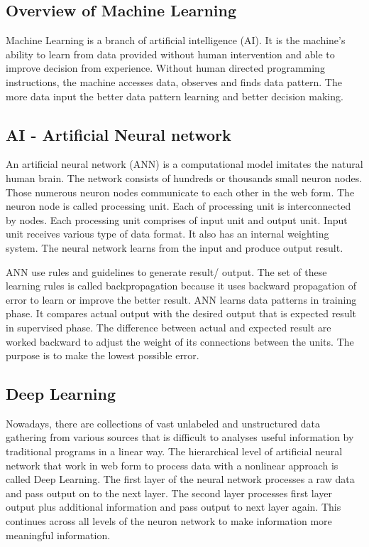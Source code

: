 \documentclass[12pt,oneside,openright,a4paper]{cpe-english-project}
\begin{document}
\subsection{Overview of Machine Learning}

\hspace{10mm}Machine Learning is a branch of artificial intelligence (AI).  It is the machine’s ability to learn from data provided without human intervention and able to improve decision from experience.  Without human directed programming instructions, the machine accesses data, observes and finds data pattern. The more data input the better data pattern learning and better decision making.\cite{ml}

\subsection{AI - Artificial Neural network}

\hspace{10mm}An artificial neural network (ANN) is a computational model imitates the natural human brain. The network consists of hundreds or thousands small neuron nodes. Those numerous neuron nodes communicate to each other in the web form. The neuron node is called processing unit. Each of processing unit is interconnected by nodes. Each processing unit comprises of input unit and output unit. Input unit receives various type of data format. It also has an internal weighting system. The neural network learns from the input and produce output result.

\hspace{10mm}ANN use rules and guidelines to generate result/ output. The set of these learning rules is called backpropagation because it uses backward propagation of error to learn or improve the better result. ANN learns data patterns in training phase. It compares actual output with the desired output that is expected result in supervised phase. The difference between actual and expected result are worked backward to adjust the weight of its connections between the units. The purpose is to make the lowest possible error. \cite{ann}

\subsection{Deep Learning}

\hspace{10mm}Nowadays, there are collections of vast unlabeled and unstructured data gathering from various sources that is difficult to analyses useful information by traditional programs in a linear way.  The hierarchical level of artificial neural network that work in web form to process data with a nonlinear approach is called Deep Learning.  The first layer of the neural network processes a raw data and pass output on to the next layer. The second layer processes first layer output plus additional information and pass output to next layer again. This continues across all levels of the neuron network to make information more meaningful information. \cite{deepLearning}
\end{document}
